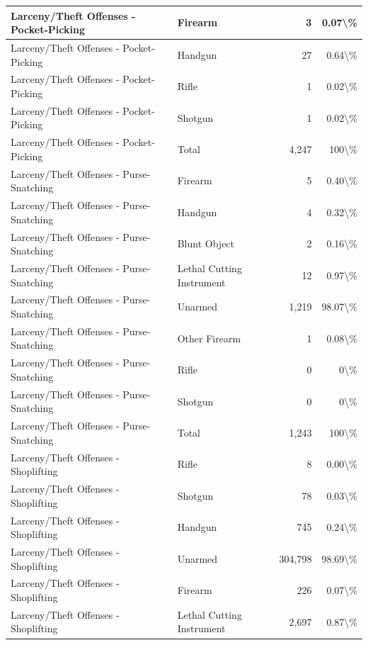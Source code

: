 \documentclass[
]{krantz}
\begin{document}
\begin{longtable}[t]{l|l|r|r}
\hline
Larceny/Theft Offenses - Pocket-Picking & Firearm & 3 & 0.07\textbackslash{}\%\\
\hline
Larceny/Theft Offenses - Pocket-Picking & Handgun & 27 & 0.64\textbackslash{}\%\\
\hline
Larceny/Theft Offenses - Pocket-Picking & Rifle & 1 & 0.02\textbackslash{}\%\\
\hline
Larceny/Theft Offenses - Pocket-Picking & Shotgun & 1 & 0.02\textbackslash{}\%\\
\hline
Larceny/Theft Offenses - Pocket-Picking & Total & 4,247 & 100\textbackslash{}\%\\
\hline
Larceny/Theft Offenses - Purse-Snatching & Firearm & 5 & 0.40\textbackslash{}\%\\
\hline
Larceny/Theft Offenses - Purse-Snatching & Handgun & 4 & 0.32\textbackslash{}\%\\
\hline
Larceny/Theft Offenses - Purse-Snatching & Blunt Object & 2 & 0.16\textbackslash{}\%\\
\hline
Larceny/Theft Offenses - Purse-Snatching & Lethal Cutting Instrument & 12 & 0.97\textbackslash{}\%\\
\hline
Larceny/Theft Offenses - Purse-Snatching & Unarmed & 1,219 & 98.07\textbackslash{}\%\\
\hline
Larceny/Theft Offenses - Purse-Snatching & Other Firearm & 1 & 0.08\textbackslash{}\%\\
\hline
Larceny/Theft Offenses - Purse-Snatching & Rifle & 0 & 0\textbackslash{}\%\\
\hline
Larceny/Theft Offenses - Purse-Snatching & Shotgun & 0 & 0\textbackslash{}\%\\
\hline
Larceny/Theft Offenses - Purse-Snatching & Total & 1,243 & 100\textbackslash{}\%\\
\hline
Larceny/Theft Offenses - Shoplifting & Rifle & 8 & 0.00\textbackslash{}\%\\
\hline
Larceny/Theft Offenses - Shoplifting & Shotgun & 78 & 0.03\textbackslash{}\%\\
\hline
Larceny/Theft Offenses - Shoplifting & Handgun & 745 & 0.24\textbackslash{}\%\\
\hline
Larceny/Theft Offenses - Shoplifting & Unarmed & 304,798 & 98.69\textbackslash{}\%\\
\hline
Larceny/Theft Offenses - Shoplifting & Firearm & 226 & 0.07\textbackslash{}\%\\
\hline
Larceny/Theft Offenses - Shoplifting & Lethal Cutting Instrument & 2,697 & 0.87\textbackslash{}\%\\

\end{longtable}
\end{document}
